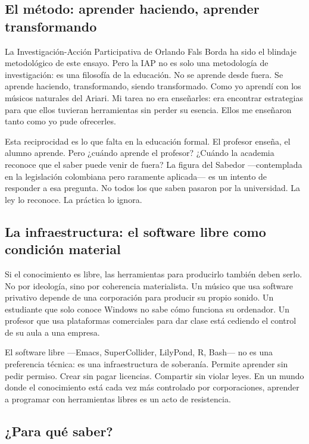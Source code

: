 \documentclass[14pt, a4paper]{article}
\begin{document}
\subsection{El método: aprender haciendo, aprender transformando}
\label{sec:orgfb4826c}

La Investigación-Acción Participativa de Orlando Fals Borda ha sido el
blindaje metodológico de este ensayo. Pero la IAP no es solo una
metodología de investigación: es una filosofía de la educación. No se
aprende desde fuera. Se aprende haciendo, transformando, siendo
transformado. Como yo aprendí con los músicos naturales del Ariari. Mi
tarea no era enseñarles: era encontrar estrategias para que ellos
tuvieran herramientas sin perder su esencia. Ellos me enseñaron tanto
como yo pude ofrecerles.

Esta reciprocidad es lo que falta en la educación formal. El profesor
enseña, el alumno aprende. Pero ¿cuándo aprende el profesor? ¿Cuándo
la academia reconoce que el saber puede venir de fuera? La figura del
Sabedor —contemplada en la legislación colombiana pero raramente
aplicada— es un intento de responder a esa pregunta. No todos los que
saben pasaron por la universidad. La ley lo reconoce. La práctica lo
ignora.
\subsection{La infraestructura: el software libre como condición material}
\label{sec:org7a89bd0}

Si el conocimiento es libre, las herramientas para producirlo también
deben serlo. No por ideología, sino por coherencia materialista. Un
músico que usa software privativo depende de una corporación para
producir su propio sonido. Un estudiante que solo conoce Windows no
sabe cómo funciona su ordenador. Un profesor que usa plataformas
comerciales para dar clase está cediendo el control de su aula a una
empresa.

El software libre —Emacs, SuperCollider, LilyPond, R, Bash— no es una
preferencia técnica: es una infraestructura de soberanía. Permite
aprender sin pedir permiso. Crear sin pagar licencias. Compartir sin
violar leyes. En un mundo donde el conocimiento está cada vez más
controlado por corporaciones, aprender a programar con herramientas
libres es un acto de resistencia.
\subsection{¿Para qué saber?}
\label{sec:org7ed2c31}
\end{document}
